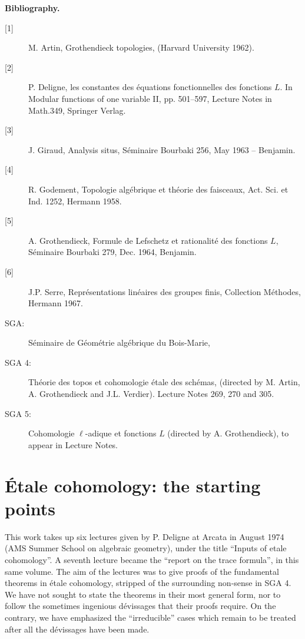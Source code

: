 \begin{center}\textbf{Bibliography.}\end{center}
\begin{description}
\item[{[1]}] M. Artin, Grothendieck topologies, (Harvard University 1962).
\item[{[2]}] P. Deligne, les constantes des équations fonctionnelles des
fonctions $L$. In Modular functions of one variable II, pp. 501--597, Lecture
Notes in Math.349, Springer Verlag.
\item[{[3]}] J. Giraud, Analysis situs, Séminaire Bourbaki 256, May 1963 -- Benjamin.
\item[{[4]}] R. Godement, Topologie algébrique et théorie des faisceaux,
Act. Sci. et Ind. 1252, Hermann 1958.
\item[{[5]}] A. Grothendieck, Formule de Lefschetz et rationalité des fonctions
$L$, Séminaire Bourbaki 279, Dec. 1964, Benjamin.
\item[{[6]}] J.P. Serre, Représentations linéaires des groupes finis,
Collection Méthodes, Hermann 1967.
\end{description}
\begin{description}
\item[SGA:] Séminaire de Géométrie algébrique du Bois-Marie,
\item[SGA 4:] Théorie des topos et cohomologie étale des schémas,
(directed by M. Artin, A. Grothendieck and J.L. Verdier).
Lecture Notes 269, 270 and 305.
\item[SGA 5:] Cohomologie $\ell$-adique et fonctions $L$
(directed by A. Grothendieck), to appear in Lecture Notes.
\end{description}


\chapter{Étale cohomology: the starting points}\label{I}

This work takes up six lectures given by P. Deligne at Arcata in August 1974
(AMS Summer School on algebraic geometry), under the title ``Inputs of etale
cohomology''. A seventh lecture became the ``report on the trace formula'',
in this same volume. The aim of the lectures was to give proofs of the
fundamental theorems in étale cohomology, stripped of the surrounding
non-sense in SGA 4. We have not sought to state the theorems in their most
general form, nor to follow the sometimes ingenious dévissages that their
proofs require. On the contrary, we have emphasized the ``irreducible''
cases which remain to be treated after all the dévissages have been made.

